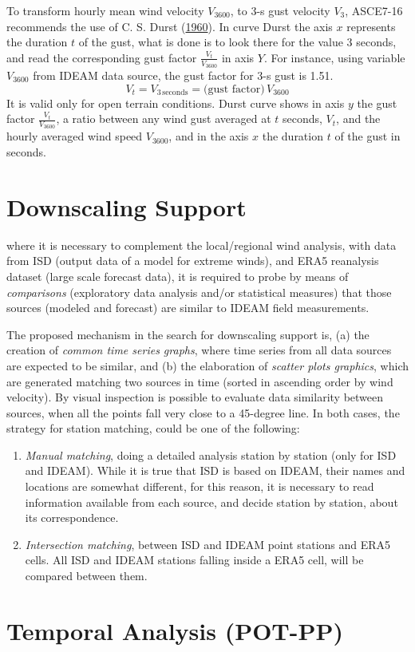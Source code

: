 \documentclass[12pt,oneside]{reedthesis}
\begin{document}
To transform hourly mean wind velocity \(V_{3600}\), to 3-s gust velocity \(V_3\), ASCE7-16 recommends the use of C. S. Durst (\protect\hyperlink{ref-Durst1960}{1960}). In curve Durst the axis \(x\) represents the duration \(t\) of the gust, what is done is to look there for the value 3 seconds, and read the corresponding gust factor \(\frac{V_t}{V_{3600}}\) in axis \(Y\). For instance, using variable \(V_{3600}\) from IDEAM data source, the gust factor for 3-s gust is 1.51.
\begin{equation}
        V_t = V_{3\,\textrm{seconds}} = \textrm{(gust factor)}\,V_{3600}
  \label{eq:vt}
\end{equation}
It is valid only for open terrain conditions. Durst curve shows in axis \(y\) the gust factor \(\frac{V_t}{V_{3600}}\), a ratio between any wind gust averaged at \(t\) seconds, \(V_t\), and the hourly averaged wind speed \(V_{3600}\), and in the axis \(x\) the duration \(t\) of the gust in seconds.

\hypertarget{ds}{%
\section{Downscaling Support}\label{ds}}

where it is necessary to complement the local/regional wind analysis, with data from ISD (output data of a model for extreme winds), and ERA5 reanalysis dataset (large scale forecast data), it is required to probe by means of \emph{comparisons} (exploratory data analysis and/or statistical measures) that those sources (modeled and forecast) are similar to IDEAM field measurements.

The proposed mechanism in the search for downscaling support is, (a) the creation of \emph{common time series graphs}, where time series from all data sources are expected to be similar, and (b) the elaboration of \emph{scatter plots graphics}, which are generated matching two sources in time (sorted in ascending order by wind velocity). By visual inspection is possible to evaluate data similarity between sources, when all the points fall very close to a 45-degree line. In both cases, the strategy for station matching, could be one of the following:
\begin{enumerate}
\def\labelenumi{\arabic{enumi}.}
\item
  \emph{Manual matching}, doing a detailed analysis station by station (only for ISD and IDEAM). While it is true that ISD is based on IDEAM, their names and locations are somewhat different, for this reason, it is necessary to read information available from each source, and decide station by station, about its correspondence.
\item
  \emph{Intersection matching}, between ISD and IDEAM point stations and ERA5 cells. All ISD and IDEAM stations falling inside a ERA5 cell, will be compared between them.
\end{enumerate}
\hypertarget{pot-pp}{%
\section{Temporal Analysis (POT-PP)}\label{pot-pp}}
\end{document}
